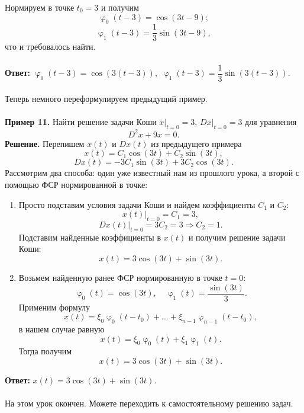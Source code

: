 \documentclass[a4paper, 12pt]{article}
\renewcommand{\varphi}{\upvarphi}
\begin{document}
Нормируем в точке $t_0 = 3$ и получим
$$\varphi_0(t - 3) = \cos(3t - 9);$$
$$\varphi_1(t - 3) = \dfrac{1}{3}\sin(3t - 9),$$
что и требовалось найти.\\\\
\textbf{Ответ:} $\varphi_0(t - 3) = \cos(3(t - 3)),$
$\varphi_1(t - 3) = \dfrac{1}{3}\sin(3(t - 3)).$\\\\
Теперь немного переформулируем предыдущий пример.\\\\
\textbf{Пример 11.} Найти решение задачи Коши $x|_{t=0} = 3$, $Dx|_{t=0} = 3$ для уравнения
$$D^2x + 9x = 0.$$
\textbf{Решение.} Перепишем $x(t)$ и $Dx(t)$ из предыдущего примера
$$x(t) = C_1\cos(3t) + C_2\sin(3t),$$
$$Dx(t) = -3C_1\sin(3t) + 3C_2\cos(3t).$$
Рассмотрим два способа: один уже известный нам из прошлого урока, а второй с помощью ФСР нормированной в точке:
\begin{enumerate}
	\item Просто подставим условия задачи Коши и найдем коэффициенты $C_1$ и $C_2$:
	$$x(t)|_{t=0} = C_1 = 3,$$
	$$Dx(t)|_{t=0} = 3C_2 = 3 \Rightarrow C_2 = 1.$$
	Подставим найденные коэффициенты в $x(t)$ и получим решение задачи Коши:
	$$x(t) = 3\cos(3t) + \sin(3t).$$
	\item Возьмем найденную ранее ФСР нормированную в точке $t = 0$:
	$$\varphi_0(t) = \cos(3t),\quad \varphi_1(t) = \dfrac{\sin(3t)}{3}.$$
	Применим формулу $$x(t) = \xi_0\varphi_0(t-t_0) + \ldots + \xi_{n-1}\varphi_{n-1}(t-t_0),$$
	в нашем случае равную
	$$x(t) = \xi_0\varphi_0(t) + \xi_{1}\varphi_{1}(t).$$
	Тогда получим $$x(t) = 3\cos(3t) + \sin(3t).$$ 
\end{enumerate}
\textbf{Ответ:} $x(t) = 3\cos(3t) + \sin(3t).$\\\\
На этом урок окончен. Можете переходить к самостоятельному решению задач.
 
\end{document}
